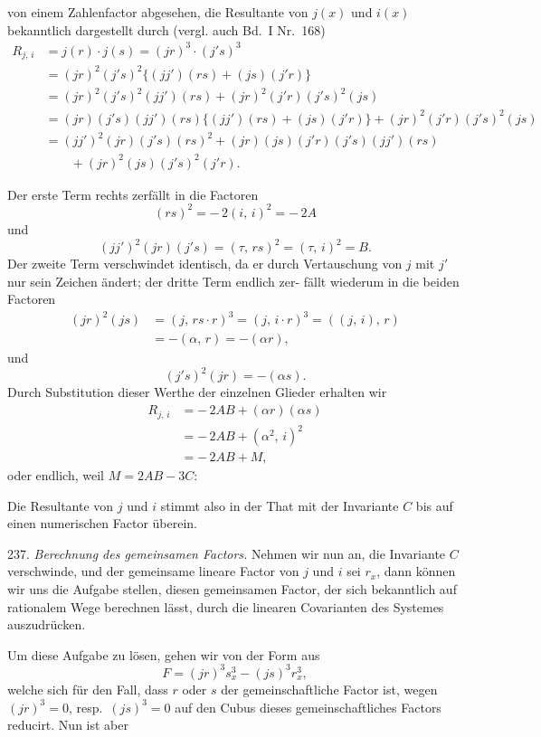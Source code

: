 von einem Zahlenfactor abgesehen, die Resultante von $j(x)$ und $i(x)$
bekanntlich dargestellt durch (vergl. auch Bd.\ I Nr.\ 168)
\[
\begin{aligned}
R_{j,\,i} &= j(r)\cdot j(s) = (jr)^3\cdot(j's)^3 \\
&= (jr)^2(j's)^2\{(jj')(rs)+(js)(j'r)\} \\
&= (jr)^2(j's)^2(jj')(rs)+(jr)^2(j'r)(j's)^2(js) \\
&= (jr)(j's)(jj')(rs)\{(jj')(rs)+(js)(j'r)\}+(jr)^2(j'r)(j's)^2(js) \\
&= (jj')^2(jr)(j's)(rs)^2+(jr)(js)(j'r)(j's)(jj')(rs) \\
&\qquad {}+(jr)^2(js)(j's)^2(j'r).
\end{aligned}
\]

Der erste Term rechts zerf\"allt in die Factoren
\[
(rs)^2 = -\,2(i,\,i)^2 = -\,2A
\]
und
\[
(jj')^2(jr)(j's) = (\tau,\,rs)^2 = (\tau,\,i)^2 = B.
\]
Der zweite Term verschwindet identisch, da er durch Vertauschung
von $j$ mit $j'$ nur sein Zeichen \"andert; der dritte Term endlich zer-
f\"allt wiederum in die beiden Factoren
\[
\begin{aligned}
(jr)^2(js) &= (j,\,rs\cdot r)^3 = (j,\,i\cdot r)^3 = ((j,\,i),\,r) \\
&= -(\alpha,\,r) = -(\alpha r),
\end{aligned}
\]
und
\[
(j's)^2(jr) = -(\alpha s).
\]
Durch Substitution dieser Werthe der einzelnen Glieder erhalten wir
\[
\begin{aligned}
R_{j,\,i} &= -\,2AB+(\alpha r)(\alpha s) \\
&= -\,2AB+(\alpha^2,\,i)^2 \\
&= -\,2AB+M,
\end{aligned}
\]
oder endlich, weil $M=2AB-3C$:

Die Resultante von $j$ und $i$ stimmt also in der That mit der
Invariante $C$ bis auf einen numerischen Factor überein.

237. \textit{Berechnung des gemeinsamen Factors.} Nehmen wir nun an,
die Invariante $C$ verschwinde, und der gemeinsame lineare Factor von
$j$ und $i$ sei $r_x$, dann k\"onnen wir uns die Aufgabe stellen, diesen gemeinsamen
 Factor, der sich bekanntlich auf rationalem Wege berechnen
 l\"asst, durch die linearen Covarianten des Systemes auszudr\"ucken.

Um diese Aufgabe zu l\"osen, gehen wir von der Form aus
\[
F = (jr)^3 s_x^3 - (js)^3 r_x^3,
\]
welche sich f\"ur den Fall, dass $r$ oder $s$ der gemeinschaftliche Factor
ist, wegen $(jr)^3=0$, resp.\ $(js)^3=0$ auf den Cubus dieses gemeinschaftliches
 Factors reducirt. Nun ist aber


